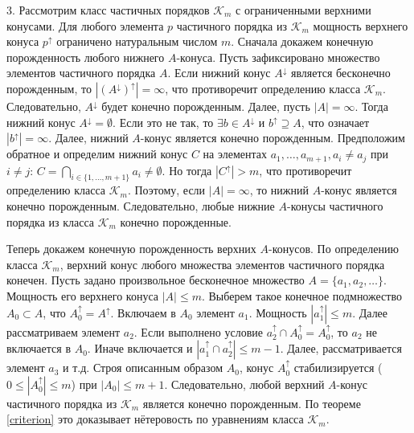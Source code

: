 \documentclass[12pt]{article}
\theoremstyle{break}
\def\K{\mathcal{K}_m}
\begin{document}
		3. Рассмотрим класс частичных порядков $\K$ с ограниченными верхними конусами. Для любого элемента $p$ частичного порядка из $\K$ мощность верхнего конуса $p^{\uparrow}$ ограничено натуральным числом $m$. Сначала докажем конечную порожденность любого нижнего $A$-конуса. Пусть зафиксировано множество элементов частичного порядка $A$. Если нижний конус $A^{\downarrow}$ является бесконечно порожденным, то $|(A^{\downarrow})^{\uparrow}| = \infty$, что противоречит определению класса $\K$. Следовательно, $A^{\downarrow}$ будет конечно порожденным. Далее, пусть $|A| = \infty$. Тогда нижний конус $A^{\downarrow} = \emptyset$. Если это не так, то $\exists b\in A^{\downarrow}$ и $b^{\uparrow} \supseteq A$, что означает $|b^{\uparrow}| = \infty$. Далее, нижний $A$-конус является конечно порожденным. Предположим обратное и определим нижний конус $C$ на элементах $a_1,\dots,a_{m+1}, a_i\neq a_j$ при $i\neq j$: $C = \bigcap_{i\in\{1,\dots, m+1\}}a_{i} \neq \emptyset$. Но тогда $|C^{\uparrow}| > m$, что противоречит определению класса $\K$. Поэтому, если $|A|=\infty$, то нижний $A$-конус является конечно порожденным. Следовательно, любые нижние $A$-конусы частичного порядка из класса $\K$ конечно порожденные.

		Теперь докажем конечную порожденность верхних $A$-конусов. По определению класса $\K$, верхний конус любого множества элементов частичного порядка конечен. Пусть задано произвольное бесконечное множество $A = \{a_1, a_2,\dots\}$. Мощность его верхнего конуса $|A| \leqslant m$. Выберем такое конечное подмножество $A_0\subset A$, что $A_0^{\uparrow} = A^{\uparrow}$. Включаем в $A_0$ элемент $a_1$. Мощность $|a_1^{\uparrow}| \leqslant m.$ Далее рассматриваем элемент $a_2$. Если выполнено условие $a_2^{\uparrow} \cap A_0^{\uparrow} = A_0^{\uparrow}$, то $a_2$ не включается в $A_0$. Иначе включается и $|a_1^{\uparrow} \cap a_2^{\uparrow}| \leqslant m-1$. Далее, рассматривается элемент $a_3$ и т.д. Строя описанным образом $A_0$, конус $A_0^{\uparrow}$ стабилизируется ($0 \leqslant |A_0^{\uparrow}| \leqslant m$) при $|A_0|\leqslant m+1$. Следовательно, любой верхний $A$-конус частичного порядка из $\K$ является конечно порожденным. По теореме \ref{criterion} это доказывает нётеровость по уравнениям класса $\K$.

		
	
\end{document}
